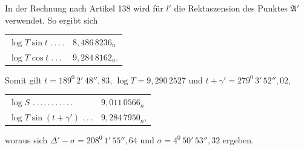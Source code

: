 In der Rechnung nach Artikel 138 wird für $l'$ die Rektaszension des Punktes $\mathfrak A'$ verwendet. So ergibt sich
\begin{center}\begin{tabular}{ll}
$\log T\sin t$ .\,.\,.\,. & $8{,}486\,8236_n$\\
$\log T\cos t$ .\,.\,. & $9{,}284\,8162_n$.
\end{tabular}\end{center}
\noindent Somit gilt $t=189^0\,2'\,48''{,}83$, $\log T=9{,}290\,2527$ und \mbox{$t+\gamma'=279^0\,3'\,52''{,}02$},
\begin{center}\begin{tabular}{ll}
$\log S$ .\,.\,.\,.\,.\,.\,.\,.\,.\,.\,. & $9{,}011\,0566_n$\\
$\log T\sin(t+\gamma')$ .\,.\,. & $9{,}284\,7950_n$,
\end{tabular}\end{center}
\noindent woraus sich $\Delta'-\sigma=208^0\,1'\,55''{,}64$ und $\sigma=4^0\,50'\,53''{,}32$ ergeben.

